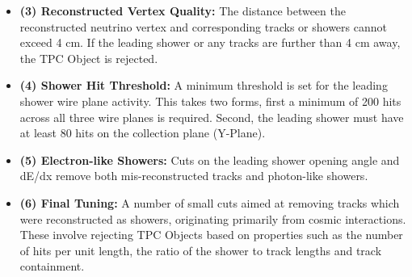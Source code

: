 \begin{itemize}
    \item \textbf{(3) Reconstructed Vertex Quality:} The distance between the reconstructed neutrino vertex and corresponding tracks or showers cannot exceed 4 cm. If the leading shower or any tracks are further than 4 cm away, the TPC Object is rejected.
    
    
    \item \textbf{(4) Shower Hit Threshold:} A minimum threshold is set for the leading shower wire plane activity. This takes two forms, first a minimum of 200 hits across all three wire planes is required. Second, the leading shower must have at least 80 hits on the collection plane (Y-Plane).
    
    \item \textbf{(5) Electron-like Showers:} Cuts on the leading shower opening angle and dE/dx remove both mis-reconstructed tracks and photon-like showers.
    
    
    
    
    \item \textbf{(6) Final Tuning:} A number of small cuts aimed at removing tracks which were reconstructed as showers, originating primarily from cosmic interactions. These involve rejecting TPC Objects based on properties such as the number of hits per unit length, the ratio of the shower to track lengths and track containment.

\end{itemize}

